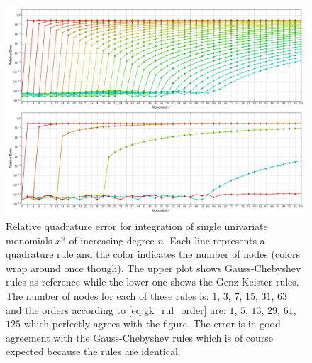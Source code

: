 \documentclass[a4paper,10pt]{article}
\begin{document}
\begin{figure}
  \centering
  \includegraphics[width=\linewidth]{./img/monomial_errors_chebyshevu.pdf}
  \caption{Relative quadrature error for integration of single univariate monomials $x^n$ of increasing degree $n$.
  Each line represents a quadrature rule and the color indicates the number of nodes (colors wrap around once though).
  The upper plot shows Gauss-Chebyshev rules as reference while the lower one shows the Genz-Keister rules.
  The number of nodes for each of these rules is:
  $1$, $3$,  $7$, $15$, $31$,  $63$ and the orders according to \eqref{eq:gk_rul_order} are:
  $1$, $5$, $13$, $29$, $61$, $125$ which perfectly agrees with the figure.
  The error is in good agreement with the Gauss-Chebyshev rules which is of course
  expected because the rules are identical.}
  \label{fig:monomial_errors_chebyshevu}
\end{figure}
\end{document}
